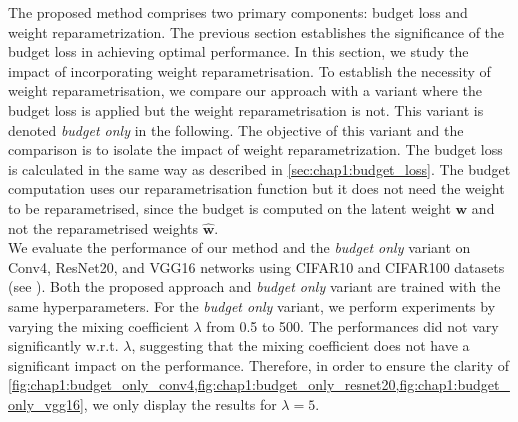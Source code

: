 
The proposed method comprises two primary components: budget loss and weight
reparametrization. The previous section establishes the significance of the
budget loss in achieving optimal performance. In this section, we study the
impact of incorporating weight reparametrisation. To establish the necessity of
weight reparametrisation, we compare our approach with a variant where the
budget loss is applied but the weight reparametrisation is not. This variant is
denoted \emph{budget only} in the following. The objective of this variant and
the comparison is to isolate the impact of weight reparametrization. The budget
loss is calculated in the same way as described in \cref{sec:chap1:budget_loss}.
The budget computation uses our reparametrisation function but it does not need
the weight to be reparametrised, since the budget is computed on the latent
weight $\mathbf{w}$ and not the reparametrised weights $\mathbf{\hat{w}}$.\\


We evaluate the performance of our method and the \emph{budget only} variant on
Conv4, ResNet20, and VGG16 networks using CIFAR10 and CIFAR100 datasets (see
).
Both the proposed approach and \emph{budget only} variant are trained with the
same hyperparameters. For the \textit{budget only} variant,  we perform
experiments by varying the mixing coefficient $\lambda$ from 0.5 to 500. The
performances did not vary significantly w.r.t. $\lambda$, suggesting that the
mixing coefficient does not have a significant impact on the performance.
Therefore, in order to ensure the clarity of
\cref{fig:chap1:budget_only_conv4,fig:chap1:budget_only_resnet20,fig:chap1:budget_only_vgg16},
we only display the results for $\lambda = 5$.\\

